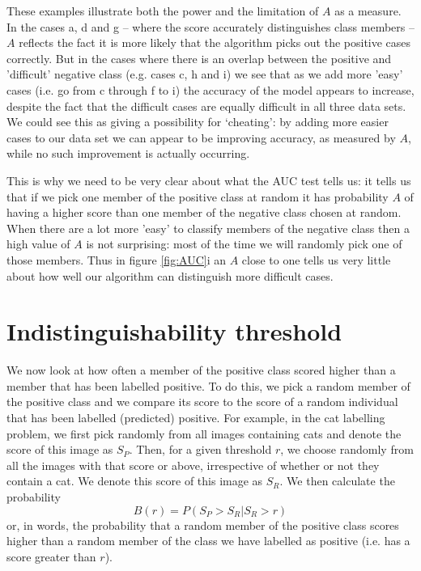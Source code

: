 \documentclass[preprint,12pt]{article}
\begin{document}
These examples illustrate both the power and the limitation of $A$ as a measure. In the cases a, d and g – where the score accurately distinguishes class members – $A$ reflects the fact it is more likely that the algorithm picks out the positive cases correctly. But in the cases where there is an overlap between the positive and 'difficult' negative class (e.g. cases c, h and i) we see that as we add more 'easy' cases (i.e. go from c through f to i) the accuracy of the model appears to increase, despite the fact that the difficult cases are equally difficult in all three data sets. We could see this as giving a possibility for `cheating': by adding more easier cases to our data set we can appear to be improving accuracy, as measured by $A$, while no such improvement is actually occurring. 

This is why we need to be very clear about what the AUC test tells us: it tells us that if we pick one member of the positive class at random it has probability $A$ of having a higher score than one member of the negative class chosen at random. When there are a lot more 'easy'  to classify members of the negative class then a high value of $A$ is not surprising: most of the time we will randomly pick one of those members. Thus in figure \ref{fig:AUC}i  an $A$ close to one tells us very little about how well our algorithm can distinguish more difficult cases. 

\section{Indistinguishability threshold}

We now look at how often a member of the positive class scored higher than a member that has been labelled positive. To do this, we pick a random member of the positive class and we compare its score to the score of a random individual that has been labelled (predicted) positive. For example, in the cat labelling problem, we first pick randomly from all images containing cats and denote the score of this image as $S_P$. Then, for a given threshold $r$, we choose randomly from all the images with that score or above, irrespective of whether or not they contain a cat. We denote this score of this image as $S_R$. We then calculate the probability 
\[
B(r) = P(S_P>S_R | S_R>r) 
\]
or, in words, the probability that a random member of the positive class scores higher than a random member of the class we have labelled as positive (i.e. has a score greater than $r$). 
\end{document}
